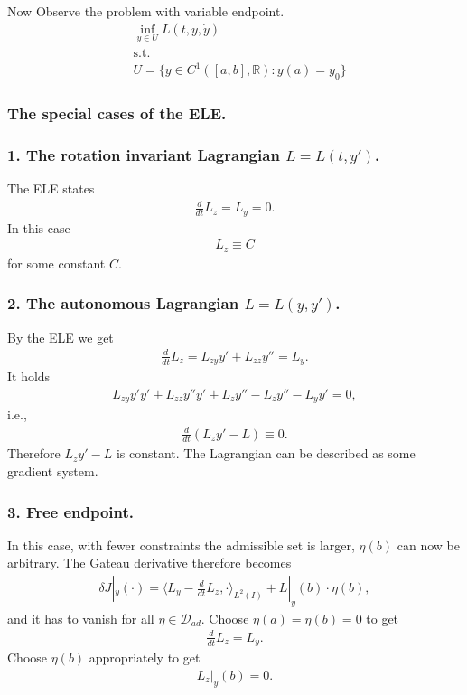 Now Observe the problem with variable endpoint. 
\begin{equation}\tag{(P2)}\label{prob:P2}
\begin{aligned}
	& \inf_{y \in U} L(t, y, \dot{y})\\
	& \text{s.t.}\\
	& U = \{y \in C^1([a, b], \mathbb{R}) : y(a) = y_0\}
\end{aligned}
\end{equation}


\subsubsection{The special cases of the ELE.}
\subsubsection{1. The rotation invariant Lagrangian $L = L(t, y')$.}
The ELE states
\begin{align*}
	\frac{d}{dt}L_z = L_y = 0. 
\end{align*}
In this case 
\begin{align*}
	L_z \equiv C
\end{align*}
for some constant $C$. 

\subsubsection{2. The autonomous Lagrangian $L = L(y, y')$.}
By the ELE we get 
\begin{align*}
	\frac{d}{dt}L_z = L_{zy} y' + L_{zz} y'' = L_y.  
\end{align*}
It holds
\begin{align*}
	L_{zy} y' y' + L_{zz} y'' y' + L_z y'' - L_z y'' - L_y y' = 0,
\end{align*}
i.e., 
\begin{align*}
	\frac{d}{dt}(L_z y' - L) \equiv 0.
\end{align*}
Therefore $L_z y' - L$ is constant. The Lagrangian can be described as some gradient system. 

\subsubsection{3. Free endpoint. }
In this case, with fewer constraints the admissible set is larger, $\eta(b)$ can now be arbitrary. The Gateau derivative therefore becomes
\begin{align*}
	\delta J|_y(\cdot ) = \langle L_y - \frac{d}{dt}L_z, \cdot \rangle_{L^2(I)} + L|_y(b) \cdot \eta(b),
\end{align*} 
and it has to vanish for all $\eta \in \mathcal{D}_{ad}$.  Choose $\eta(a) = \eta(b) = 0$ to get
\begin{align*}
	\frac{d}{dt}L_z = L_y. 
\end{align*} Choose $\eta(b)$ appropriately to get
\begin{align*}
	L_z|_y (b) = 0. 
\end{align*}


